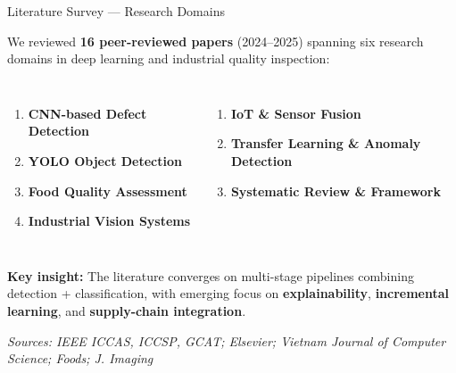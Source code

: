 \documentclass[10pt]{beamer}
\begin{document}
\begin{frame}{Literature Survey --- Research Domains}

\small
We reviewed \textbf{16 peer-reviewed papers} (2024--2025) spanning six research domains in deep learning and industrial quality inspection:

\vspace{6pt}
\begin{columns}[T]
\begin{enumerate}\setlength{\itemsep}{5pt}
    \item \textbf{CNN-based Defect Detection}
    \item \textbf{YOLO Object Detection}
    \item \textbf{Food Quality Assessment}
    \item \textbf{Industrial Vision Systems}
\end{enumerate}
\begin{enumerate}\setlength{\itemsep}{5pt}\setcounter{enumi}{4}
    \item \textbf{IoT \& Sensor Fusion}
    \item \textbf{Transfer Learning \& Anomaly Detection}
    \item \textbf{Systematic Review \& Framework}
\end{enumerate}
\end{columns}

\vspace{8pt}
\textbf{Key insight:} The literature converges on multi-stage pipelines combining detection + classification, with emerging focus on \textbf{explainability}, \textbf{incremental learning}, and \textbf{supply-chain integration}.

\vspace{6pt}
\small\textit{Sources: IEEE ICCAS, ICCSP, GCAT; Elsevier; Vietnam Journal of Computer Science; Foods; J. Imaging}

\end{frame}
\end{document}
